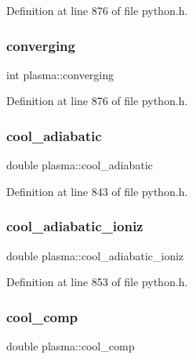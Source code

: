 Definition at line 876 of file python.\+h.

\mbox{\label{structplasma_a89b513b0ebeb3ecad39803fc04e2dc6c}} 
\subsubsection{\texorpdfstring{converging}{converging}}
{\footnotesize\ttfamily int plasma\+::converging}



Definition at line 876 of file python.\+h.

\mbox{\label{structplasma_acf37090e0b83fe81d058f21229a90018}} 
\subsubsection{\texorpdfstring{cool\+\_\+adiabatic}{cool\_adiabatic}}
{\footnotesize\ttfamily double plasma\+::cool\+\_\+adiabatic}



Definition at line 843 of file python.\+h.

\mbox{\label{structplasma_a7030de50e435921b13630ea339eb13e9}} 
\subsubsection{\texorpdfstring{cool\+\_\+adiabatic\+\_\+ioniz}{cool\_adiabatic\_ioniz}}
{\footnotesize\ttfamily double plasma\+::cool\+\_\+adiabatic\+\_\+ioniz}



Definition at line 853 of file python.\+h.

\mbox{\label{structplasma_a0af59963361b8b69b3f29c31a303b7c6}} 
\subsubsection{\texorpdfstring{cool\+\_\+comp}{cool\_comp}}
{\footnotesize\ttfamily double plasma\+::cool\+\_\+comp}



